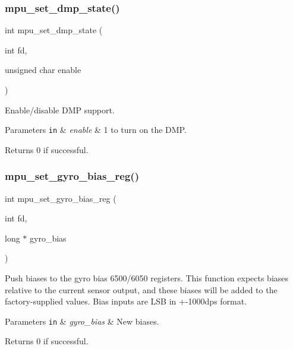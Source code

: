 \subsubsection{mpu\+\_\+set\+\_\+dmp\+\_\+state()}
{\footnotesize\ttfamily int mpu\+\_\+set\+\_\+dmp\+\_\+state (\begin{DoxyParamCaption}\item[{int}]{fd,  }\item[{unsigned char}]{enable }\end{DoxyParamCaption})}



Enable/disable D\+MP support. 


\begin{DoxyParams}[1]{Parameters}
\mbox{\tt in}  & {\em enable} & 1 to turn on the D\+MP. \\
\hline
\end{DoxyParams}
\begin{DoxyReturn}{Returns}
0 if successful. 
\end{DoxyReturn}
\mbox{\label{group___d_r_i_v_e_r_s_gae57e178d7ae8399ec6f310bbb3028c60}} 
\subsubsection{mpu\+\_\+set\+\_\+gyro\+\_\+bias\+\_\+reg()}
{\footnotesize\ttfamily int mpu\+\_\+set\+\_\+gyro\+\_\+bias\+\_\+reg (\begin{DoxyParamCaption}\item[{int}]{fd,  }\item[{long $\ast$}]{gyro\+\_\+bias }\end{DoxyParamCaption})}



Push biases to the gyro bias 6500/6050 registers. This function expects biases relative to the current sensor output, and these biases will be added to the factory-\/supplied values. Bias inputs are L\+SB in +-\/1000dps format. 


\begin{DoxyParams}[1]{Parameters}
\mbox{\tt in}  & {\em gyro\+\_\+bias} & New biases. \\
\hline
\end{DoxyParams}
\begin{DoxyReturn}{Returns}
0 if successful. 
\end{DoxyReturn}
\mbox{\label{group___d_r_i_v_e_r_s_ga3909706f3192d1bfc1e54a906e5e8f70}} 
